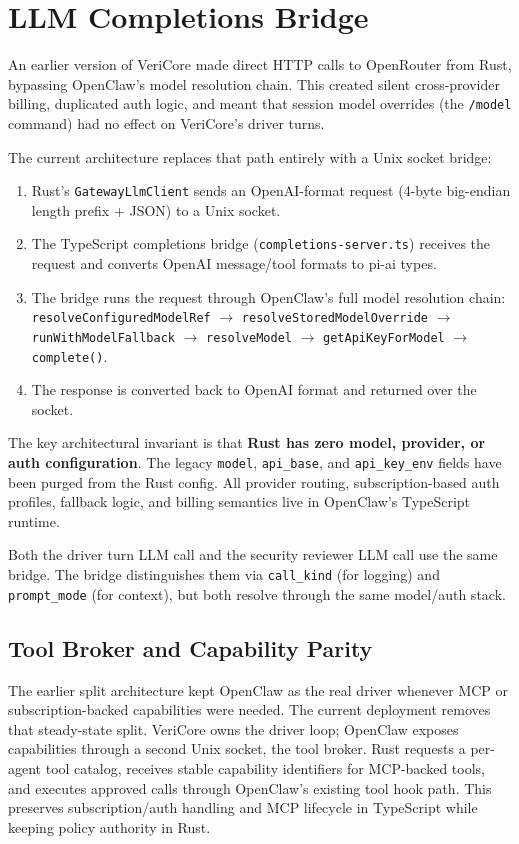 \documentclass[11pt]{article}
\begin{document}
\section{LLM Completions Bridge}
An earlier version of VeriCore made direct HTTP calls to OpenRouter from Rust, bypassing OpenClaw's model resolution chain. This created silent cross-provider billing, duplicated auth logic, and meant that session model overrides (the \texttt{/model} command) had no effect on VeriCore's driver turns.

The current architecture replaces that path entirely with a Unix socket bridge:
\begin{enumerate}[label=\arabic*.]
\item Rust's \texttt{GatewayLlmClient} sends an OpenAI-format request (4-byte big-endian length prefix + JSON) to a Unix socket.
\item The TypeScript completions bridge (\texttt{completions-server.ts}) receives the request and converts OpenAI message/tool formats to pi-ai types.
\item The bridge runs the request through OpenClaw's full model resolution chain: \texttt{resolveConfiguredModelRef} $\to$ \texttt{resolveStoredModelOverride} $\to$ \texttt{runWithModelFallback} $\to$ \texttt{resolveModel} $\to$ \texttt{getApiKeyForModel} $\to$ \texttt{complete()}.
\item The response is converted back to OpenAI format and returned over the socket.
\end{enumerate}

The key architectural invariant is that \textbf{Rust has zero model, provider, or auth configuration}. The legacy \texttt{model}, \texttt{api\_base}, and \texttt{api\_key\_env} fields have been purged from the Rust config. All provider routing, subscription-based auth profiles, fallback logic, and billing semantics live in OpenClaw's TypeScript runtime.

Both the driver turn LLM call and the security reviewer LLM call use the same bridge. The bridge distinguishes them via \texttt{call\_kind} (for logging) and \texttt{prompt\_mode} (for context), but both resolve through the same model/auth stack.

\subsection{Tool Broker and Capability Parity}
The earlier split architecture kept OpenClaw as the real driver whenever MCP or subscription-backed capabilities were needed. The current deployment removes that steady-state split. VeriCore owns the driver loop; OpenClaw exposes capabilities through a second Unix socket, the tool broker. Rust requests a per-agent tool catalog, receives stable capability identifiers for MCP-backed tools, and executes approved calls through OpenClaw's existing tool hook path. This preserves subscription/auth handling and MCP lifecycle in TypeScript while keeping policy authority in Rust.
\end{document}
